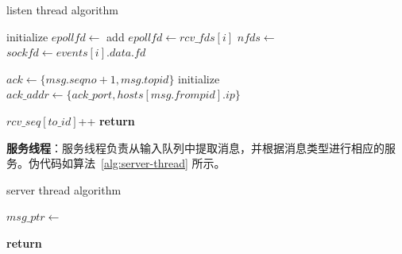 {\begin{enumerate}[label=\arabic*.]
              \begin{algorithm}[H]
                  \caption{listen thread algorithm}\label{alg:listen-thread}
                  \begin{algorithmic}[1] %
                      \State initialize $epollfd \gets$ 
                      \State add $epollfd \gets rcv\_fds[i]$
                      \EndFor
                      \State $nfds \gets$ 
                      \State $sockfd \gets events[i].data.fd$
                      \State {}

                      \State
                      \State $ack \gets \{ msg.seqno+1, msg.topid \}$
                      \State initialize $ack\_addr \gets \{ ack\_port,hosts[msg.frompid].ip \}$
                      \State {}

                      \State
                      \State $rcv\_seq[to\_id]$++
                      \State {}
                      \EndIf
                      \EndFor
                      \EndWhile
                      \State \textbf{return}
                      \EndProcedure
                  \end{algorithmic}
              \end{algorithm}

              \textbf{服务线程}：服务线程负责从输入队列中提取消息，并根据消息类型进行相应的服务。伪代码如算法~\ref{alg:server-thread} 所示。
              \begin{algorithm}[H]
                  \caption{server thread algorithm}\label{alg:server-thread}
                  \begin{algorithmic}[1] %
                      \State {}

                      \State $msg\_ptr \gets$ 
                      \State {}

                      \State {}
                      \State \textbf{return}
                      \EndProcedure
                  \end{algorithmic}
              \end{algorithm}


\end{enumerate}}
